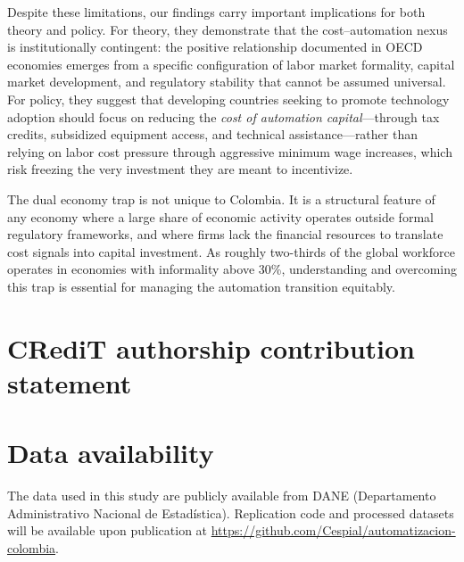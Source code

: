\documentclass[a4paper,fleqn]{cas-sc}
\begin{document}
Despite these limitations, our findings carry important implications for both theory and policy. For theory, they demonstrate that the cost--automation nexus is institutionally contingent: the positive relationship documented in OECD economies emerges from a specific configuration of labor market formality, capital market development, and regulatory stability that cannot be assumed universal. For policy, they suggest that developing countries seeking to promote technology adoption should focus on reducing the \emph{cost of automation capital}---through tax credits, subsidized equipment access, and technical assistance---rather than relying on labor cost pressure through aggressive minimum wage increases, which risk freezing the very investment they are meant to incentivize.

The dual economy trap is not unique to Colombia. It is a structural feature of any economy where a large share of economic activity operates outside formal regulatory frameworks, and where firms lack the financial resources to translate cost signals into capital investment. As roughly two-thirds of the global workforce operates in economies with informality above 30\%, understanding and overcoming this trap is essential for managing the automation transition equitably.


\section*{CRediT authorship contribution statement}

\printcredits

\section*{Data availability}

The data used in this study are publicly available from DANE (Departamento Administrativo Nacional de Estad\'istica). Replication code and processed datasets will be available upon publication at \url{https://github.com/Cespial/automatizacion-colombia}.

\end{document}
